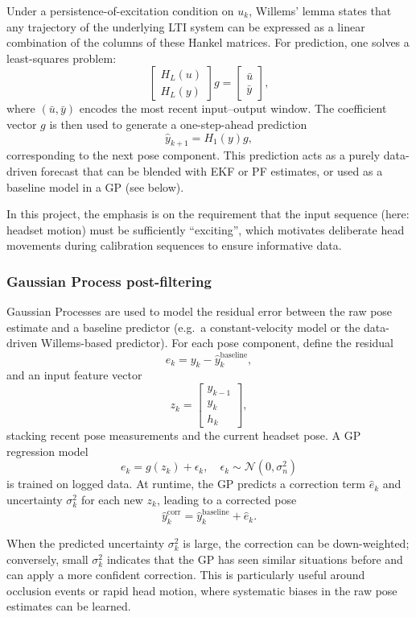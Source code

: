 Under a persistence-of-excitation condition on $u_k$, Willems’ lemma states that any trajectory of the underlying LTI system can be expressed as a linear combination of the columns of these Hankel matrices. For prediction, one solves a least-squares problem:
\[
\begin{bmatrix}
H_L(u) \\
H_L(y)
\end{bmatrix} g
=
\begin{bmatrix}
\bar{u} \\
\bar{y}
\end{bmatrix},
\]
where $(\bar{u},\bar{y})$ encodes the most recent input–output window. The coefficient vector $g$ is then used to generate a one-step-ahead prediction
\[
\hat{y}_{k+1} = H_1(y) g,
\]
corresponding to the next pose component. This prediction acts as a purely data-driven forecast that can be blended with EKF or PF estimates, or used as a baseline model in a GP (see below).

In this project, the emphasis is on the requirement that the input sequence (here: headset motion) must be sufficiently “exciting”, which motivates deliberate head movements during calibration sequences to ensure informative data.

\subsubsection*{Gaussian Process post-filtering}

Gaussian Processes are used to model the residual error between the raw pose estimate and a baseline predictor (e.g.\ a constant-velocity model or the data-driven Willems-based predictor). For each pose component, define the residual
\[
e_k = y_k - \hat{y}_k^{\text{baseline}},
\]
and an input feature vector
\[
z_k =
\begin{bmatrix}
y_{k-1} \\
y_k \\
h_k
\end{bmatrix},
\]
stacking recent pose measurements and the current headset pose. A GP regression model
\[
e_k = g(z_k) + \epsilon_k,
\quad \epsilon_k \sim \mathcal{N}(0,\sigma_n^2)
\]
is trained on logged data. At runtime, the GP predicts a correction term $\hat{e}_k$ and uncertainty $\sigma_k^2$ for each new $z_k$, leading to a corrected pose
\[
\hat{y}_k^{\text{corr}} = \hat{y}_k^{\text{baseline}} + \hat{e}_k.
\]

When the predicted uncertainty $\sigma_k^2$ is large, the correction can be down-weighted; conversely, small $\sigma_k^2$ indicates that the GP has seen similar situations before and can apply a more confident correction. This is particularly useful around occlusion events or rapid head motion, where systematic biases in the raw pose estimates can be learned.

